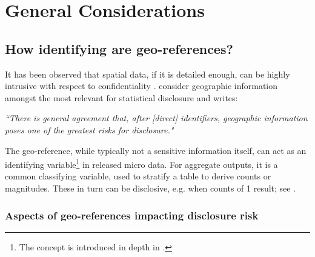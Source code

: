 \chapter{General Considerations} \label{sec:ident}

\section{How identifying are geo-references?}

It has been observed that spatial data, if it is detailed enough, can be highly intrusive with respect to confidentiality \citep{Armstrong2002, VanWeyEtAl2005, GutmannEtAl2008}. \citet[~p.56]{WillenborgDeWaal1996} consider geographic information amongst the most relevant for statistical disclosure and \citet[~p.121]{Fienberg1994} writes:
\begin{center}
\textit{``There is general agreement that, after [direct] identifiers, geographic information poses one of the greatest risks for disclosure."}
\end{center}
The geo-reference, while typically not a sensitive information itself, can act as an identifying variable\footnote{
    The concept is introduced in depth in \citet[ch. 3]{HundepoolEtAl2024}.} 
in released micro data.
For aggregate outputs, it is a common classifying variable, used to stratify a table to derive counts or magnitudes. These in turn can be disclosive, e.g. when counts of 1 result; see \citet[5.2]{HundepoolEtAl2024}.

\subsection{Aspects of geo-references impacting disclosure risk}

